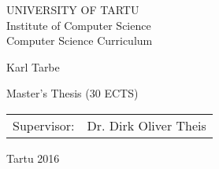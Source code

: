 \thispagestyle{empty}
\begin{center}

\large
UNIVERSITY OF TARTU\\[2mm]
Institute of Computer Science\\
Computer Science Curriculum\\[2mm]

\vspace{25mm}

\Large Karl Tarbe

\vspace{4mm}

\huge \myTitle

\vspace{20mm}

\Large Master's Thesis (30 ECTS)

\end{center}

\vspace{2mm}

\begin{flushright}
 {
 \setlength{\extrarowheight}{5pt}
 \begin{tabular}{r l} 
  \sffamily Supervisor: & \sffamily Dr. Dirk Oliver Theis
 \end{tabular}
 }
\end{flushright}

\vfill
\centerline{Tartu 2016}
